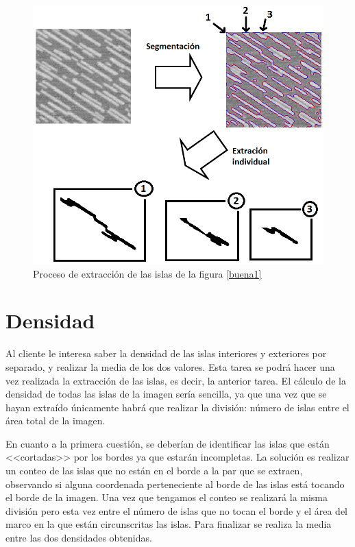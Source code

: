 \begin{figure}[H]
	\captionsetup{justification=centering}
	\centering
	\includegraphics[width=1\textwidth]{./imagenes/extraccionIslaBuena}
	\caption{Proceso de extracci\'{o}n de las islas de la figura \ref{buena1} }	
	\label{extraccionIslaBuena}
\end{figure}



\section{Densidad}

Al cliente le interesa saber la densidad de las islas interiores y exteriores por separado, y realizar la media de los dos valores. Esta tarea se podr\'{a} hacer una vez realizada la extracci\'{o}n de las islas, es decir, la anterior tarea. El c\'{a}lculo de la densidad de todas las islas de la imagen ser\'{i}a sencilla, ya que una vez que se hayan extra\'{i}do \'{u}nicamente habr\'{a} que realizar la divisi\'{o}n: n\'{u}mero de islas entre el \'{a}rea total de la imagen.

 En cuanto a la primera cuesti\'{o}n, se deber\'{i}an de identificar las islas que est\'{a}n <<cortadas>> por los bordes ya que estar\'{a}n incompletas. La soluci\'{o}n es realizar un conteo de las islas que no est\'{a}n en el borde a la par que se extraen, observando si alguna coordenada perteneciente al borde de las islas est\'{a} tocando el borde de la imagen. Una vez que tengamos el conteo se realizar\'{a} la misma divisi\'{o}n pero esta vez entre el n\'{u}mero de islas que no tocan el borde y el \'{a}rea del marco en la que est\'{a}n circunscritas las islas. Para finalizar se realiza la media entre las dos densidades obtenidas.

